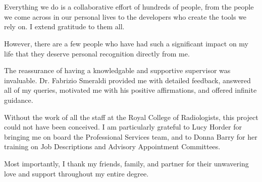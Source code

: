 \section*{}
\vspace{10pt}

Everything we do is a collaborative effort of hundreds of people, from the people we come across in our personal lives to the developers who create the tools we rely on. I extend gratitude to them all. 

However, there are a few people who have had such a significant impact on my life that they deserve personal recognition directly from me.

The reassurance of having a knowledgable and supportive supervisor was invaluable. Dr. Fabrizio Smeraldi provided me with detailed feedback, answered all of my queries, motivated me with his positive affirmations, and offered infinite guidance. 

Without the work of all the staff at the Royal College of Radiologists, this project could not have been conceived. I am particularly grateful to Lucy Horder for bringing me on board the Professional Services team, and to Donna Barry for her training on Job Descriptions and Advisory Appointment Committees.

Most importantly, I thank my friends, family, and partner for their unwavering love and support throughout my entire degree.